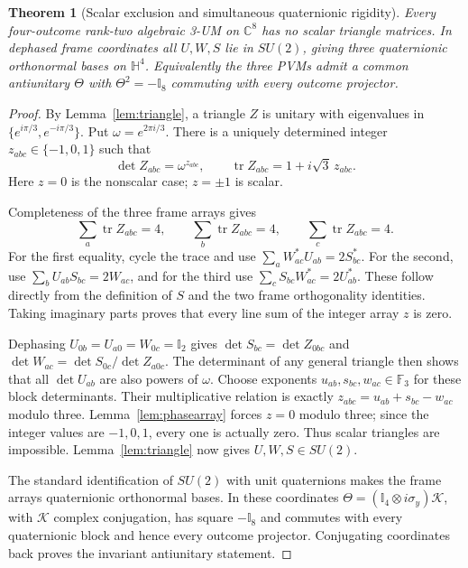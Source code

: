\documentclass[11pt]{article}
\newtheorem{theorem}{Theorem}[section]
\newcommand{\id}{\mathbb I}
\begin{document}
\begin{theorem}[Scalar exclusion and simultaneous quaternionic rigidity]
\label{thm:quaternionrigidity}
Every four-outcome rank-two algebraic 3-UM on $\mathbb C^8$ has no scalar
triangle matrices. In dephased frame coordinates all $U,W,S$ lie in
$SU(2)$, giving three quaternionic orthonormal bases on $\mathbb H^4$.
Equivalently the three PVMs admit a common antiunitary $\Theta$ with
$\Theta^2=-\id_8$ commuting with every outcome projector.
\end{theorem}
\begin{proof}
By Lemma~\ref{lem:triangle}, a triangle $Z$ is unitary with eigenvalues
in $\{e^{i\pi/3},e^{-i\pi/3}\}$. Put $\omega=e^{2\pi i/3}$.
There is a uniquely determined integer $z_{abc}\in\{-1,0,1\}$ such that
\[
 \det Z_{abc}=\omega^{z_{abc}},\qquad
 \operatorname{tr}Z_{abc}=1+i\sqrt3\,z_{abc}.
\]
Here $z=0$ is the nonscalar case; $z=\pm1$ is scalar.

Completeness of the three frame arrays gives
\[
 \sum_a\operatorname{tr}Z_{abc}=4,\qquad
 \sum_b\operatorname{tr}Z_{abc}=4,\qquad
 \sum_c\operatorname{tr}Z_{abc}=4.
\]
For the first equality, cycle the trace and use
$\sum_a W_{ac}^*U_{ab}=2S_{bc}^*$.
For the second, use $\sum_b U_{ab}S_{bc}=2W_{ac}$, and for the third
use $\sum_c S_{bc}W_{ac}^*=2U_{ab}^*$.
These follow directly from the definition of $S$ and the two frame
orthogonality identities. Taking imaginary parts proves that every line
sum of the integer array $z$ is zero.

Dephasing $U_{0b}=U_{a0}=W_{0c}=\id_2$ gives
$\det S_{bc}=\det Z_{0bc}$ and
$\det W_{ac}=\det S_{0c}/\det Z_{a0c}$.
The determinant of any general triangle then shows that all
$\det U_{ab}$ are also powers of $\omega$. Choose exponents
$u_{ab},s_{bc},w_{ac}\in\mathbb F_3$ for these block determinants.
Their multiplicative relation is exactly
$z_{abc}=u_{ab}+s_{bc}-w_{ac}$ modulo three.
Lemma~\ref{lem:phasearray} forces $z=0$ modulo three; since the integer
values are $-1,0,1$, every one is actually zero. Thus scalar triangles
are impossible. Lemma~\ref{lem:triangle} now gives $U,W,S\in SU(2)$.

The standard identification of $SU(2)$ with unit quaternions makes the
frame arrays quaternionic orthonormal bases. In these coordinates
$\Theta=(\id_4\otimes i\sigma_y)\mathcal K$, with $\mathcal K$ complex
conjugation, has square $-\id_8$ and commutes with every quaternionic
block and hence every outcome projector. Conjugating coordinates back
proves the invariant antiunitary statement.
\end{proof}
\end{document}
